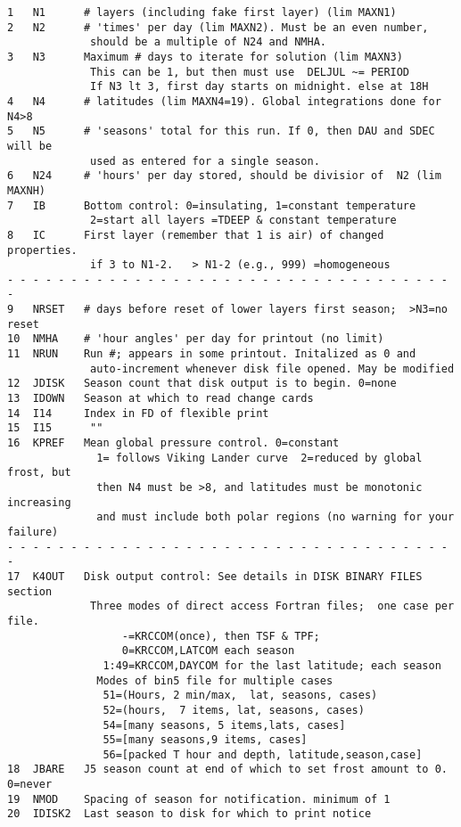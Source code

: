 \documentclass[draft]{article}  %
\begin{document}
\begin{verbatim}
1   N1      # layers (including fake first layer) (lim MAXN1)
2   N2      # 'times' per day (lim MAXN2). Must be an even number, 
             should be a multiple of N24 and NMHA.
3   N3      Maximum # days to iterate for solution (lim MAXN3)
             This can be 1, but then must use  DELJUL ~= PERIOD
             If N3 lt 3, first day starts on midnight. else at 18H 
4   N4      # latitudes (lim MAXN4=19). Global integrations done for N4>8
5   N5      # 'seasons' total for this run. If 0, then DAU and SDEC will be 
             used as entered for a single season.
6   N24     # 'hours' per day stored, should be divisior of  N2 (lim MAXNH)
7   IB      Bottom control: 0=insulating, 1=constant temperature 
             2=start all layers =TDEEP & constant temperature 
8   IC      First layer (remember that 1 is air) of changed properties. 
             if 3 to N1-2.   > N1-2 (e.g., 999) =homogeneous
- - - - - - - - - - - - - - - - - - - - - - - - - - - - - - - - - - - - 
9   NRSET   # days before reset of lower layers first season;  >N3=no reset
10  NMHA    # 'hour angles' per day for printout (no limit)
11  NRUN    Run #; appears in some printout. Initalized as 0 and   
             auto-increment whenever disk file opened. May be modified
12  JDISK   Season count that disk output is to begin. 0=none
13  IDOWN   Season at which to read change cards
14  I14     Index in FD of flexible print
15  I15      ""
16  KPREF   Mean global pressure control. 0=constant
              1= follows Viking Lander curve  2=reduced by global frost, but
              then N4 must be >8, and latitudes must be monotonic increasing
              and must include both polar regions (no warning for your failure)
- - - - - - - - - - - - - - - - - - - - - - - - - - - - - - - - - - - - 
17  K4OUT   Disk output control: See details in DISK BINARY FILES section
             Three modes of direct access Fortran files;  one case per file.
                  -=KRCCOM(once), then TSF & TPF;
                  0=KRCCOM,LATCOM each season
               1:49=KRCCOM,DAYCOM for the last latitude; each season
              Modes of bin5 file for multiple cases
               51=(Hours, 2 min/max,  lat, seasons, cases)
               52=(hours,  7 items, lat, seasons, cases)
               54=[many seasons, 5 items,lats, cases]
               55=[many seasons,9 items, cases]
               56=[packed T hour and depth, latitude,season,case]
18  JBARE   J5 season count at end of which to set frost amount to 0. 0=never
19  NMOD    Spacing of season for notification. minimum of 1
20  IDISK2  Last season to disk for which to print notice

\end{verbatim}
\end{document}
